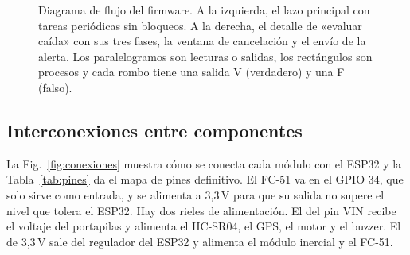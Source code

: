 \documentclass[conference,a4paper]{IEEEtran}
\begin{document}
\begin{figure}[!t]
\caption{Diagrama de flujo del firmware. A la izquierda, el lazo principal con tareas periódicas sin bloqueos. A la derecha, el detalle de «evaluar caída» con sus tres fases, la ventana de cancelación y el envío de la alerta. Los paralelogramos son lecturas o salidas, los rectángulos son procesos y cada rombo tiene una salida V (verdadero) y una F (falso).}
\label{fig:flujo}
\end{figure}

\subsection{Interconexiones entre componentes}

La Fig.~\ref{fig:conexiones} muestra cómo se conecta cada módulo con el ESP32 y la Tabla~\ref{tab:pines} da el mapa de pines definitivo. El FC-51 va en el GPIO 34, que solo sirve como entrada, y se alimenta a 3,3\,V para que su salida no supere el nivel que tolera el ESP32. Hay dos rieles de alimentación. El del pin VIN recibe el voltaje del portapilas y alimenta el HC-SR04, el GPS, el motor y el buzzer. El de 3,3\,V sale del regulador del ESP32 y alimenta el módulo inercial y el FC-51.
\end{document}
